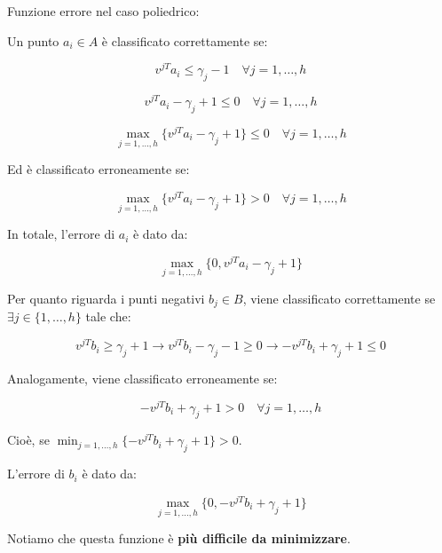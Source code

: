 \begin{definition}
    Funzione errore nel caso poliedrico:

    Un punto $a_i \in A$ è classificato correttamente se:

    $$
        v^{jT} a_i \leq \gamma_j -1 \quad \forall j = 1, \dots, h
    $$

    $$
        v^{jT} a_i - \gamma_j + 1 \leq 0 \quad \forall j = 1, \dots, h
    $$

    $$
        \max_{j=1, \dots, h} \{v^{jT} a_i - \gamma_j + 1\} \leq 0 \quad \forall j = 1, \dots, h
    $$

    Ed è classificato erroneamente se:

    $$
    \max_{j=1, \dots, h} \{v^{jT} a_i - \gamma_j + 1\} > 0 \quad \forall j = 1, \dots, h
    $$

    In totale, l'errore di $a_i$ è dato da:

    $$
        \max_{j=1, \dots, h} \{0, v^{jT} a_i - \gamma_j + 1\}
    $$

    Per quanto riguarda i punti negativi $b_j \in B$, viene classificato 
    correttamente se $\exists j \in \{1, \dots, h\}$ tale che:

    $$
    v^{jT} b_i \geq \gamma_j + 1 \rightarrow v^{jT} b_i - \gamma_j - 1 \geq 0 \rightarrow -v^{jT} b_i + \gamma_j + 1 \leq 0
    $$

    Analogamente, viene classificato erroneamente se:

    $$
    -v^{jT} b_i + \gamma_j + 1 > 0 \quad \forall j = 1, \dots, h
    $$

    Cioè, se $\min_{j=1, \dots, h} \{-v^{jT} b_i + \gamma_j + 1\} > 0$.

    L'errore di $b_i$ è dato da:

    $$
    \max_{j=1, \dots, h} \{0, -v^{jT} b_i + \gamma_j + 1\}
    $$    

    Notiamo che questa funzione è \textbf{più difficile da minimizzare}.


\end{definition}
